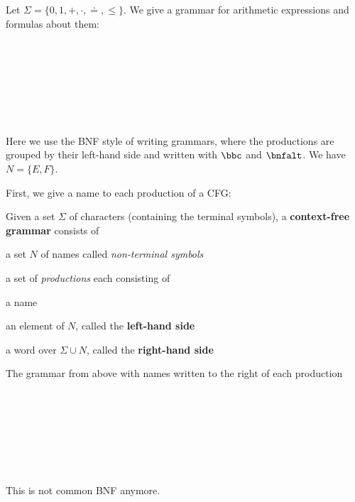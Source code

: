 \begin{example}
Let $\Sigma=\{0,1,+,\cdot,\doteq,\leq\}$.
We give a grammar for arithmetic expressions and formulas about them:
\begin{commgrammar}
\\
\\
\\
\\
\\
\\
\end{commgrammar}
Here we use the BNF style of writing grammars, where the productions are grouped by their left-hand side and written with $\bbc$ and $\bnfalt$.
We have $N=\{E,F\}$.
\end{example}

First, we give a name to each production of a CFG:

\begin{definition}
Given a set $\Sigma$ of characters (containing the terminal symbols), a \textbf{context-free grammar} consists of
\begin{compactitem}
\item a set $N$ of names called \emph{non-terminal symbols}
\item a set of \emph{productions} each consisting of
 \begin{compactitem}
  \item a name
  \item an element of $N$, called the \textbf{left-hand side}
  \item a word over $\Sigma\cup N$, called the \textbf{right-hand side}
 \end{compactitem}
\end{compactitem}
\end{definition}

\begin{example}
The grammar from above with names written to the right of each production
\begin{commgrammar}
\\
\\
\\
\\
\\
\\
\end{commgrammar}
This is not common BNF anymore.
\end{example}


